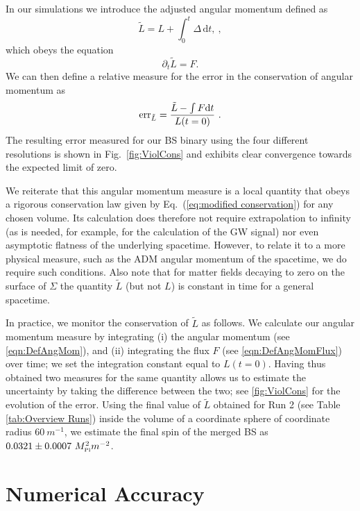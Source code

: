 \documentclass[aps,twocolumn,nofootinbib,superscriptaddress,amsfonts,floatfix
]{revtex4-1} %
\newcommand{\mpl}{M_{\mbox{\tiny Pl}}}
\newcommand{\dd}{\mathrm{d}}
\begin{document}
In our simulations we introduce the adjusted angular momentum
defined as
\begin{equation}
 \tilde{L} = {L}+\int_{0}^t {\Delta} \,\dd t, \label{eqn:DefAngMom}~,
\end{equation}
which obeys the equation 
\begin{equation}
\label{eq:modified conservation}\partial_t\tilde{L} = {F}.
\end{equation}
We can then define a relative measure for the error in the
conservation of angular momentum as
\begin{equation}
    {\rm err }_{\tilde{L}} = \frac{\tilde{L} - \int F {\rm d}t}{{L}(t=0)}~.\label{eqn:ang_mom}
\end{equation}
The resulting error measured for our BS binary using the
four different resolutions is shown in Fig.~\ref{fig:ViolCons}
and exhibits clear convergence towards the expected limit of
zero.

We reiterate that this angular momentum measure is a
local quantity that obeys a rigorous conservation law
given by Eq.~(\ref{eq:modified conservation}) for
any chosen volume.
Its calculation does therefore not require extrapolation
to infinity (as is needed, for example, for the calculation
of the GW signal) nor even asymptotic flatness of the underlying spacetime.
However, to relate it to a more physical measure, such as the ADM angular momentum of the spacetime, we do require such conditions.
Also note that for matter fields decaying to zero on the surface of $\Sigma$ the quantity $\tilde{L}$ (but not $L$) is constant in time for a general spacetime. 

In practice, we monitor the conservation of $\tilde{L}$ as follows.
We calculate our angular momentum measure by integrating (i) the angular momentum (see \cref{eqn:DefAngMom}), and (ii) integrating the flux $F$ (see \cref{eqn:DefAngMomFlux}) over time; we set the integration constant equal to ${L}(t=0)$. Having thus obtained two measures for the same quantity allows us to estimate the uncertainty by taking the difference between the two; see \cref{fig:ViolCons} for the evolution of the error. 
Using the final value of $\tilde{L}$ obtained for Run 2
(see Table \ref{tab:Overview Runs}) inside the volume of
a coordinate sphere of coordinate radius $60~m^{-1}$, we estimate the final spin
of the merged BS as $0.0321 \pm 0.0007~\mpl^2 m^{-2}$.

\section{Numerical Accuracy}
\label{sec:numacc}
\end{document}

